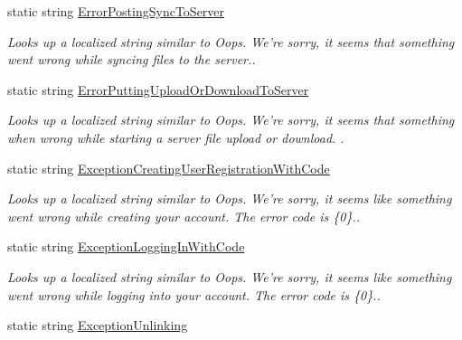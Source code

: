 \begin{DoxyCompactItemize}
static string \hyperlink{class_cloud_api_public_1_1_resources_1_1_resources_aee243a146f3f50aa829353a1de9edfd6}{Error\-Posting\-Sync\-To\-Server}
\begin{DoxyCompactList}\small\item\em Looks up a localized string similar to Oops. We're sorry, it seems that something went wrong while syncing files to the server.. \end{DoxyCompactList}\item 
static string \hyperlink{class_cloud_api_public_1_1_resources_1_1_resources_a933b73178f56c88ee5e2c1226836ed93}{Error\-Putting\-Upload\-Or\-Download\-To\-Server}
\begin{DoxyCompactList}\small\item\em Looks up a localized string similar to Oops. We're sorry, it seems that something when wrong while starting a server file upload or download. . \end{DoxyCompactList}\item 
static string \hyperlink{class_cloud_api_public_1_1_resources_1_1_resources_a4b199c62caa1e34ada782114db226ac8}{Exception\-Creating\-User\-Registration\-With\-Code}
\begin{DoxyCompactList}\small\item\em Looks up a localized string similar to Oops. We're sorry, it seems like something went wrong while creating your account. The error code is \{0\}.. \end{DoxyCompactList}\item 
static string \hyperlink{class_cloud_api_public_1_1_resources_1_1_resources_a091b4f8c09d926a27ef6e15a7dbcd279}{Exception\-Logging\-In\-With\-Code}
\begin{DoxyCompactList}\small\item\em Looks up a localized string similar to Oops. We're sorry, it seems like something went wrong while logging into your account. The error code is \{0\}.. \end{DoxyCompactList}\item 
static string \hyperlink{class_cloud_api_public_1_1_resources_1_1_resources_aeeb1b258cfd57eff1a315794865f189b}{Exception\-Unlinking}

\end{DoxyCompactItemize}
